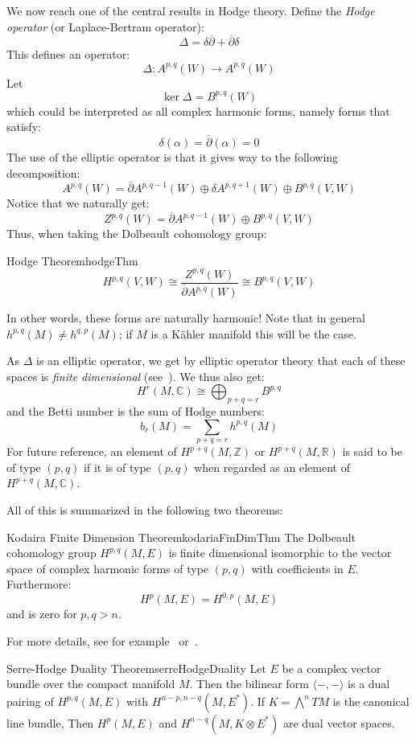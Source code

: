 \documentclass{book}
\newenvironment{Proof}[1][]
  {\begin{ProofTcb}[#1]}
  {\end{ProofTcb}}
\newcommand{\R}{{\mathbb{R}}}
\newcommand{\Z}{{\mathbb{Z}}}
\newcommand{\C}{{\mathbb{C}}}
\begin{document}
We now reach one of the central results in Hodge theory. Define the \emph{Hodge operator} (or Laplace-Bertram
operator):
\[
  \Delta = \delta\overline{\partial} + \overline{\partial}\delta
\]
This defines an operator:
\[
  \Delta: A^{p,q}(W) \to A^{p,q}(W)
\]
Let
\[
  \ker\Delta = B^{p,q}(W)
\]
which could be interpreted as all complex harmonic forms, namely forms that satisfy:
\[
  \delta(\alpha) = \overline{\partial}(\alpha) = 0
\]
The use of the elliptic operator is that it gives way to the following decomposition:
\[
  A^{p,q}(W) = \overline{\partial}A^{p, q-1}(W) \oplus \delta A^{p, q+1}(W) \oplus B^{p,q}(V,W)
\]
Notice that we naturally get:
\[
  Z^{p,q}(W) = \overline{\partial}A^{p, q-1}(W) \oplus B^{p,q}(V,W)
\]
Thus, when taking the Dolbeault cohomology group:
\begin{thm}{Hodge Theorem}{hodgeThm}
  \[
  H^{p,q}(V,W) \cong \frac{Z^{p,q}(W)}{\overline{\partial}A^{p,q}(W)} \cong B^{p,q}(V,W)
\]
\end{thm}

In other words, these forms are naturally harmonic!
Note that in general $h^{p,q}(M) \ne h^{q,p}(M)$; if $M$ is a K\"ahler manifold this will be the case.

As $\Delta$ is an elliptic operator, we get by elliptic operator theory that each of these spaces is
\emph{finite dimensional} (see~\cite{HodgeTheory2014}). We thus also get:
\[
  H^r(M, \C) \cong \bigoplus_{p+q=r} B^{p,q}
\]
and the Betti number is the sum of Hodge numbers:
\[
  b_r(M) = \sum_{p+q=r} h^{p,q}(M)
\]
For future reference, an element of $H^{p+q}(M, \Z)$ or $H^{p+q}(M, \R)$ is said to be of type $(p,q)$ if it
is of type $(p,q)$ when regarded as an element of $H^{p+q}(M, \C)$.

All of this is summarized in the following two theorems:

\begin{thm}{Kodaira Finite Dimension Theorem}{kodariaFinDimThm}
   The Dolbeault cohomology group $H^{p,q}(M,E)$ is finite dimensional
  isomorphic to the vector space of complex harmonic forms of type $(p,q)$ with coefficients in $E$.
  Furthermore:
  \[
    H^p(M,E) = H^{0,p}(M,E)
  \]
  and is zero for $p,q > n$.
\end{thm}

\begin{Proof}
  For more details, see for example~\cite{HodgeTheory2014} or~\cite{voisinHodgeTheoryComplex2002}.
\end{Proof}

\begin{thm}{Serre-Hodge Duality Theorem}{serreHodgeDuality}
  Let $E$ be a complex vector bundle over the compact manifold $M$. Then the bilinear form $\langle -,-
  \rangle$ is a dual pairing of $H^{p,q}(M,E)$ with $H^{n-p, n-q}(M, E^*)$. If $K = \bigwedge^n TM$ is the
  canonical line bundle, Then $H^p(M,E)$ and $H^{n-q}(M, K\otimes E^*)$ are dual vector spaces.
\end{thm}
\end{document}
